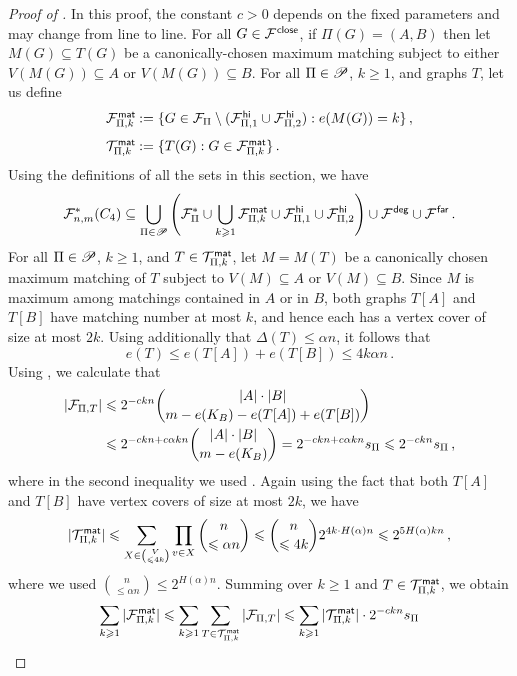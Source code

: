 \begin{proof}[Proof of ]
In this proof, the constant $c>0$ depends on the fixed parameters and may change from line to line. For all $G\in{\mathcal F}^{\hspace{0.2mm}\mathsf{close}}$, if $\Pi(G)=(A,B)$ then let $M(G)\subseteq T(G)$ be a canonically-chosen maximum matching subject to either $V(M(G))\subseteq A$ or $V(M(G))\subseteq B$. For all $\Pi\in{\mathscr P}$, $k\geq1$, and graphs $T$, let us define
\[\arraycolsep=0.4mm
\begin{array}{ll}
\cF^\mat_{\Pi,k} &:= \{G\in\cF_\Pi\setminus(\cF^\high_{\Pi,1}\cup\cF^\high_{\Pi,2}):e(M(G))=k\} \,, \\[8pt]
\cT^\mat_{\Pi,k} &:= \{T(G):G\in\cF^\mat_{\Pi,k}\} \,.
\end{array}\]
Using the definitions of all the sets in this section, we have
\begin{equation}\label{eqn:c4-union-bound}
{\mathcal F}^\ast_{n,m}(C_4)\subseteq\bigcup_{\Pi\in{\mathscr P}}\Bigg({\mathcal F}^\ast_\Pi\cup\bigcup_{k\geqslant1}{\mathcal F}^{\hspace{0.2mm}\mathsf{mat}}_{\Pi,k}\cup{\mathcal F}^{\hspace{0.2mm}\mathsf{hi}}_{\Pi,1}\cup{\mathcal F}^{\hspace{0.2mm}\mathsf{hi}}_{\Pi,2}\Bigg)\cup{\mathcal F}^{\hspace{0.2mm}\mathsf{deg}}\cup{\mathcal F}^{\hspace{0.2mm}\mathsf{far}}\,.
\end{equation}
For all $\Pi\in{\mathscr P}$, $k\geq1$, and $T\in{\mathcal T}^{\hspace{0.2mm}\mathsf{mat}}_{\Pi,k}$, let $M=M(T)$ be a canonically chosen maximum matching of $T$ subject to $V(M)\subseteq A$ or $V(M)\subseteq B$. Since $M$ is maximum among matchings contained in $A$ or in $B$, both graphs $T[A]$ and $T[B]$ have matching number at most $k$, and hence each has a vertex cover of size at most $2k$. Using additionally that $\Delta(T)\leq\alpha n$, it follows that
$$e(T)\leq e(T[A])+e(T[B])\leq 4k\alpha n\,.$$
Using , we calculate that
\begin{align*}
|{\mathcal F}_{\Pi,T}| &\leqslant 2^{-ckn}\binom{|A|\cdot|B|}{m-e(K_B)-e(T[A])+e(T[B])} \\
&\leqslant 2^{-ckn+c\alpha kn}\binom{|A|\cdot|B|}{m-e(K_B)}
=2^{-ckn+c\alpha kn}s_\Pi \leqslant 2^{-ckn}s_\Pi \,,
\end{align*}
where in the second inequality we used \cite[Lemma~A.1(ii)]{perkins2025typical}.
Again using the fact that both $T[A]$ and $T[B]$ have vertex covers of size at most $2k$, we have
$$|{\mathcal T}^{\hspace{0.2mm}\mathsf{mat}}_{\Pi,k}|\leqslant\sum_{X\in\binom{V}{\leqslant4k}}\prod_{v\in X}\binom{n}{\leqslant\alpha n}\leqslant\binom{n}{\leqslant4k}2^{4k\cdot H(\alpha)n}\leqslant 2^{5H(\alpha)kn}\,,$$
where we used $\binom{n}{\leq\alpha n}\leq2^{H(\alpha)n}$.
Summing over $k\geq1$ and $T\in{\mathcal T}^{\hspace{0.2mm}\mathsf{mat}}_{\Pi,k}$, we obtain
\begin{equation}\label{eqn:c4-fmat-sum}
\begin{aligned}
\sum_{k\geq1}|\cF^\mat_{\Pi,k}|\leq\sum_{k\geq1}\sum_{T\in\cT^\mat_{\Pi,k}}|\cF_{\Pi,T}| &\leq \sum_{k\geq1}|\cT^\mat_{\Pi,k}|\cdot2^{-ckn}s_\Pi \\

\end{aligned}
\end{equation}
\end{proof}

